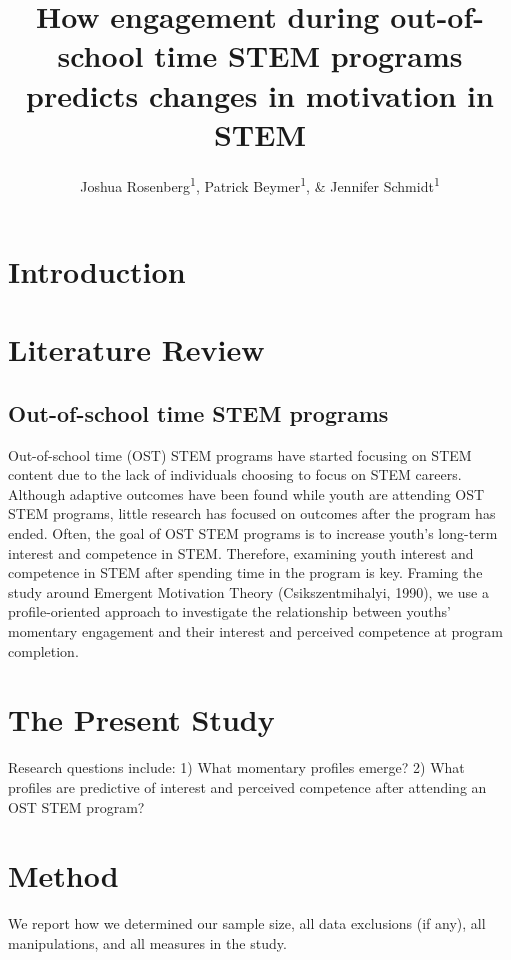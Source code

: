 \documentclass[man]{apa6}
\title{How engagement during out-of-school time STEM programs predicts changes
in motivation in STEM}
\author{Joshua Rosenberg\textsuperscript{1}, Patrick Beymer\textsuperscript{1}, \& Jennifer Schmidt\textsuperscript{1}}
\affiliation{
    \vspace{0.5cm}
          \textsuperscript{1} Michigan State University  }
\theoremstyle{definition}
\theoremstyle{definition}
\theoremstyle{definition}
\theoremstyle{remark}
\begin{document}
\maketitle

\setcounter{secnumdepth}{0}



\section{Introduction}\label{introduction}

\section{Literature Review}\label{literature-review}

\subsection{Out-of-school time STEM
programs}\label{out-of-school-time-stem-programs}

Out-of-school time (OST) STEM programs have started focusing on STEM
content due to the lack of individuals choosing to focus on STEM
careers. Although adaptive outcomes have been found while youth are
attending OST STEM programs, little research has focused on outcomes
after the program has ended. Often, the goal of OST STEM programs is to
increase youth's long-term interest and competence in STEM. Therefore,
examining youth interest and competence in STEM after spending time in
the program is key. Framing the study around Emergent Motivation Theory
(Csikszentmihalyi, 1990), we use a profile-oriented approach to
investigate the relationship between youths' momentary engagement and
their interest and perceived competence at program completion.

\section{The Present Study}\label{the-present-study}

Research questions include: 1) What momentary profiles emerge? 2) What
profiles are predictive of interest and perceived competence after
attending an OST STEM program?

\section{Method}\label{method}

We report how we determined our sample size, all data exclusions (if
any), all manipulations, and all measures in the study.
\end{document}
